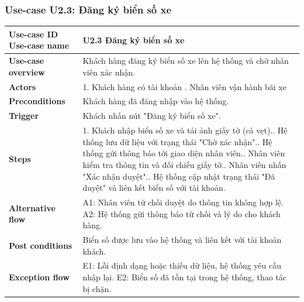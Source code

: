 \subsubsection{Use-case U2.3: Đăng ký biển số xe}
\vspace{0.5cm}
\noindent
\begin{tabularx}{\textwidth}{|>{\raggedright\arraybackslash}p{4cm}|X|}
\hline
\textbf{Use-case ID} \newline \textbf{Use-case name} & U2.3 \newline \textbf{Đăng ký biển số xe} \\ \hline
\textbf{Use-case overview} & Khách hàng đăng ký biển số xe lên hệ thống và chờ nhân viên xác nhận. \\ \hline
\textbf{Actors} & 1. Khách hàng có tài khoản \newline 2. Nhân viên vận hành bãi xe \\ \hline
\textbf{Preconditions} & Khách hàng đã đăng nhập vào hệ thống. \\ \hline
\textbf{Trigger} & Khách nhấn nút "Đăng ký biển số xe". \\ \hline

\textbf{Steps} &
1. Khách nhập biển số xe và tải ảnh giấy tờ (cà vẹt).\newline
2. Hệ thống lưu dữ liệu với trạng thái "Chờ xác nhận".\newline
3. Hệ thống gửi thông báo tới giao diện nhân viên.\newline
4. Nhân viên kiểm tra thông tin và đối chiếu giấy tờ.\newline
5. Nhân viên nhấn "Xác nhận duyệt".\newline
6. Hệ thống cập nhật trạng thái "Đã duyệt" và liên kết biển số với tài khoản. \\ \hline

\textbf{Alternative flow} &
A1: Nhân viên từ chối duyệt do thông tin không hợp lệ.\newline
A2: Hệ thống gửi thông báo từ chối và lý do cho khách hàng. \\ \hline

\textbf{Post conditions} & Biển số được lưu vào hệ thống và liên kết với tài khoản khách. \\ \hline

\textbf{Exception flow} &
E1: Lỗi định dạng hoặc thiếu dữ liệu, hệ thống yêu cầu nhập lại.\newline
E2: Biển số đã tồn tại trong hệ thống, thao tác bị chặn. \\ \hline
\end{tabularx}




